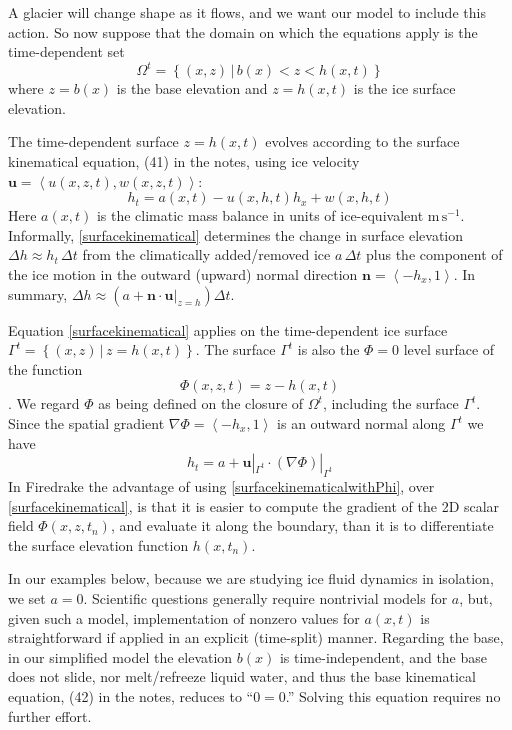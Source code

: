 \documentclass[letterpaper,final,12pt,reqno]{amsart}
\newcommand{\grad}{\nabla}
\newcommand{\bn}{\mathbf{n}}
\newcommand{\bu}{\mathbf{u}}
\begin{document}
A glacier will change shape as it flows, and we want our model to include this action.  So now suppose that the domain on which the equations apply is the time-dependent set
\begin{equation}
\Omega^t = \left\{(x,z)\,\big|\, b(x) < z < h(x,t)\right\}  \label{Omegat}
\end{equation}
where $z=b(x)$ is the base elevation and $z=h(x,t)$ is the ice surface elevation.

The time-dependent surface $z=h(x,t)$ evolves according to the surface kinematical equation, (41) in the notes, using ice velocity $\bu=\left<u(x,z,t),w(x,z,t)\right>$:
\begin{equation}
h_t = a(x,t) - u(x,h,t) h_x + w(x,h,t) \label{surfacekinematical}
\end{equation}
Here $a(x,t)$ is the climatic mass balance in units of ice-equivalent $\text{m}\,\text{s}^{-1}$.  Informally, \eqref{surfacekinematical} determines the change in surface elevation $\Delta h \approx h_t\,\Delta t$ from the climatically added/removed ice $a\,\Delta t$ plus the component of the ice motion in the outward (upward) normal direction $\bn = \left<-h_x,1\right>$.  In summary, $\Delta h \approx \left(a + \bn\cdot \bu|_{z=h}\right) \Delta t$.

Equation \eqref{surfacekinematical} applies on the time-dependent ice surface $\Gamma^t = \left\{(x,z) \,\big|\, z = h(x,t)\right\}$.  The surface $\Gamma^t$ is also the $\Phi=0$ level surface of the function
    $$\Phi(x,z,t) = z - h(x,t)$$
\cite[pp.~65--66]{GreveBlatter2009}.  We regard $\Phi$ as being defined on the closure of $\Omega^t$, including the surface $\Gamma^t$.  Since the spatial gradient $\grad \Phi = \left<-h_x,1\right>$ is an outward normal along $\Gamma^t$ we have
\begin{equation}
h_t = a + \bu|_{\Gamma^t} \cdot (\grad \Phi)|_{\Gamma^t}  \label{surfacekinematicalwithPhi}
\end{equation}
In Firedrake the advantage of using \eqref{surfacekinematicalwithPhi}, over \eqref{surfacekinematical}, is that it is easier to compute the gradient of the 2D scalar field $\Phi(x,z,t_n)$, and evaluate it along the boundary, than it is to differentiate the surface elevation function $h(x,t_n)$.

In our examples below, because we are studying ice fluid dynamics in isolation, we set $a=0$.  Scientific questions generally require nontrivial models for $a$, but, given such a model, implementation of nonzero values for $a(x,t)$ is straightforward if applied in an explicit (time-split) manner.  Regarding the base, in our simplified model the elevation $b(x)$ is time-independent, and the base does not slide, nor melt/refreeze liquid water, and thus the base kinematical equation, (42) in the notes, reduces to ``$0=0$.''  Solving this equation requires no further effort.
\end{document}
